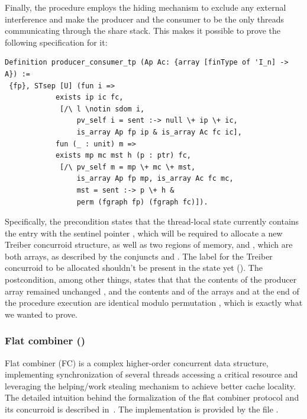 Finally, the procedure  employs the hiding
mechanism to exclude any external interference and make the producer
and the consumer to be the only threads communicating through the
share stack. This makes it possible to prove the following
specification for it:

\begin{lstlisting}
Definition producer_consumer_tp (Ap Ac: {array [finType of 'I_n] -> A}) := 
 {fp}, STsep [U] (fun i => 
            exists ip ic fc, 
             [/\ l \notin sdom i, 
                 pv_self i = sent :-> null \+ ip \+ ic, 
                 is_array Ap fp ip & is_array Ac fc ic],
            fun (_ : unit) m => 
            exists mp mc mst h (p : ptr) fc, 
             [/\ pv_self m = mp \+ mc \+ mst, 
                 is_array Ap fp mp, is_array Ac fc mc, 
                 mst = sent :-> p \+ h & 
                 perm (fgraph fp) (fgraph fc)]). 
\end{lstlisting}

Specifically, the precondition states that the thread-local state
currently contains the entry with the sentinel pointer , which will be required to allocate a new Treiber concurroid
structure, as well as two regions of memory,  and ,
which are both arrays, as described by the conjuncts  and . The label  for
the Treiber concurroid to be allocated shouldn't be present in the
state yet ().
%
The postcondition, among other things, states that that the contents
of the producer array remained unchanged ,
and the contents  and  of the arrays  and
 at the end of the procedure execution are identical modulo
permutation , which is exactly
what we wanted to prove.

 
\subsubsection{Flat combiner ()}
\label{sec:flat-combiner}

Flat combiner (FC) is a complex higher-order concurrent data structure,
implementing synchronization of several threads accessing a critical
resource and leveraging the helping/work stealing mechanism to achieve
better cache locality. The detailed intuition behind the formalization
of the flat combiner protocol and its concurroid is described
in~\cite [\S 5]{Sergey-al:ESOP15}. The implementation is provided by
the file .


